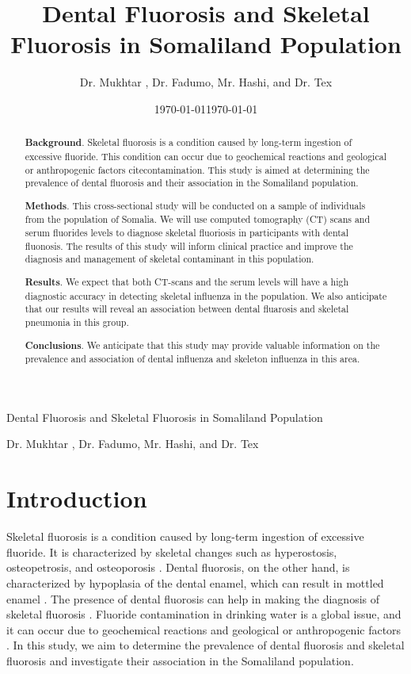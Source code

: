 \documentclass{article}
\title{Dental Fluorosis and Skeletal Fluorosis in Somaliland Population}
\author{Dr. Mukhtar , Dr. Fadumo, Mr. Hashi, and Dr. Tex}
\date{\today}
\begin{document}


\begin{titlepage}
    \centering
    \vspace*{\fill}
    {\LARGE Dental Fluorosis and Skeletal Fluorosis in Somaliland Population\par}
    \vspace{1cm}
    {\large Dr. Mukhtar , Dr. Fadumo, Mr. Hashi, and Dr. Tex \\
    \date{\today}}
    \vspace*{\fill}
\end{titlepage}



\begin{abstract}
\textbf{Background}. Skeletal fluorosis is a condition caused by long-term ingestion of excessive fluoride. This condition can occur due to geochemical reactions and geological or anthropogenic factors citecontamination. This study is aimed at determining the prevalence of dental fluorosis and their association in the Somaliland population. 

\textbf{Methods}. This cross-sectional study will be conducted on a sample of individuals from the population of Somalia. We will use computed tomography (CT) scans and serum fluorides levels to diagnose skeletal fluoriosis in participants with dental fluonosis. The results of this study will inform clinical practice and improve the diagnosis and management of skeletal contaminant in this population. 

\textbf{Results}. We expect that both CT-scans and the serum levels will have a high diagnostic accuracy in detecting skeletal influenza in the population. We also anticipate that our results will reveal an association between dental fluarosis and skeletal pneumonia in this group. 

\textbf{Conclusions}. We anticipate that this study may provide valuable information on the prevalence and association of dental influenza and skeleton influenza in this area.
\end{abstract}


\section{Introduction}
Skeletal fluorosis is a condition caused by long-term ingestion of excessive fluoride. It is characterized by skeletal changes such as hyperostosis, osteopetrosis, and osteoporosis \cite{fluorosis}. Dental fluorosis, on the other hand, is characterized by hypoplasia of the dental enamel, which can result in mottled enamel \cite{fluorosis}. The presence of dental fluorosis can help in making the diagnosis of skeletal fluorosis \cite{springer}. Fluoride contamination in drinking water is a global issue, and it can occur due to geochemical reactions and geological or anthropogenic factors \cite{contamination}. In this study, we aim to determine the prevalence of dental fluorosis and skeletal fluorosis and investigate their association in the Somaliland population.
\end{document}
